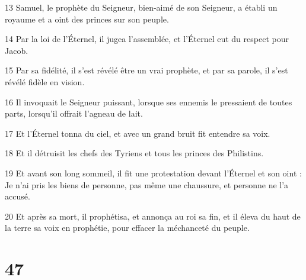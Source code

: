 \par 13 Samuel, le prophète du Seigneur, bien-aimé de son Seigneur, a établi un royaume et a oint des princes sur son peuple.
\par 14 Par la loi de l'Éternel, il jugea l'assemblée, et l'Éternel eut du respect pour Jacob.
\par 15 Par sa fidélité, il s'est révélé être un vrai prophète, et par sa parole, il s'est révélé fidèle en vision.
\par 16 Il invoquait le Seigneur puissant, lorsque ses ennemis le pressaient de toutes parts, lorsqu'il offrait l'agneau de lait.
\par 17 Et l'Éternel tonna du ciel, et avec un grand bruit fit entendre sa voix.
\par 18 Et il détruisit les chefs des Tyriens et tous les princes des Philistins.
\par 19 Et avant son long sommeil, il fit une protestation devant l'Éternel et son oint : Je n'ai pris les biens de personne, pas même une chaussure, et personne ne l'a accusé.
\par 20 Et après sa mort, il prophétisa, et annonça au roi sa fin, et il éleva du haut de la terre sa voix en prophétie, pour effacer la méchanceté du peuple.

\chapter{47}

